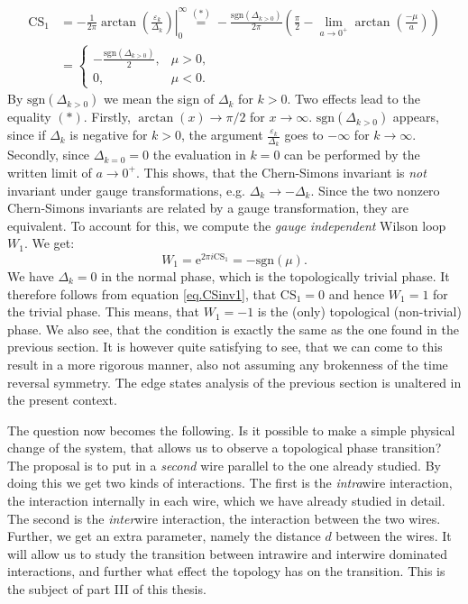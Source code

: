 \begin{align}
\text{CS}_1 &= - \frac{1}{2\pi} \left. \arctan\left(\frac{\varepsilon_k}{\Delta_k}\right)\right|^\infty_0 \overset{(*)}{=} -\frac{\text{sgn}(\Delta_{k>0})}{2\pi}\left(\frac{\pi}{2} - \lim_{a\to 0^{+}}\arctan\left(\frac{-\mu}{a}\right) \right) \nonumber \\
& = \left\{ \begin{matrix} -\frac{\text{sgn}(\Delta_{k>0})}{2}, & \mu > 0, \\ 0, & \mu < 0. \end{matrix} \right. 
\label{eq.CSinv2}
\end{align}
By $\text{sgn}(\Delta_{k>0})$ we mean the sign of $\Delta_k$ for $k > 0$. Two effects lead to the equality $(*)$. Firstly, $\arctan(x) \to \pi/2$ for $x \to \infty$. $\text{sgn}(\Delta_{k>0})$ appears, since if $\Delta_k$ is negative for $k > 0$, the argument $\frac{\varepsilon_k}{\Delta_k}$ goes to $-\infty$ for $k \to \infty$. Secondly, since $\Delta_{k=0} = 0$ the evaluation in $k = 0$ can be performed by the written limit of $a \to 0^+$. This shows, that the Chern-Simons invariant is \textit{not} invariant under gauge transformations, e.g. $\Delta_k \to - \Delta_k$. Since the two nonzero Chern-Simons invariants are related by a gauge transformation, they are equivalent. To account for this, we compute the \textit{gauge independent} Wilson loop $W_1$. We get: 
\begin{equation}
W_1 = \text{e}^{2\pi i \text{CS}_1} = -\text{sgn}(\mu). 
\end{equation}
We have $\Delta_k = 0$ in the normal phase, which is the topologically trivial phase. It therefore follows from equation \eqref{eq.CSinv1}, that $\text{CS}_1 = 0$ and hence $W_1 = 1$ for the trivial phase. This means, that $W_1 = -1$ is the (only) topological (non-trivial) phase. We also see, that the condition is exactly the same as the one found in the previous section. It is however quite satisfying to see, that we can come to this result in a more rigorous manner, also not assuming any brokenness of the time reversal symmetry. The edge states analysis of the previous section is unaltered in the present context.  

\vspace{1cm}
The question now becomes the following. Is it possible to make a simple physical change of the system, that allows us to observe a topological phase transition? The proposal is to put in a \textit{second} wire parallel to the one already studied. By doing this we get two kinds of interactions. The first is the \textit{intra}wire interaction, the interaction internally in each wire, which we have already studied in detail. The second is the \textit{inter}wire interaction, the interaction between the two wires. Further, we get an extra parameter, namely the distance $d$ between the wires. It will allow us to study the transition between intrawire and interwire dominated interactions, and further what effect the topology has on the transition. This is the subject of part III of this thesis. 

